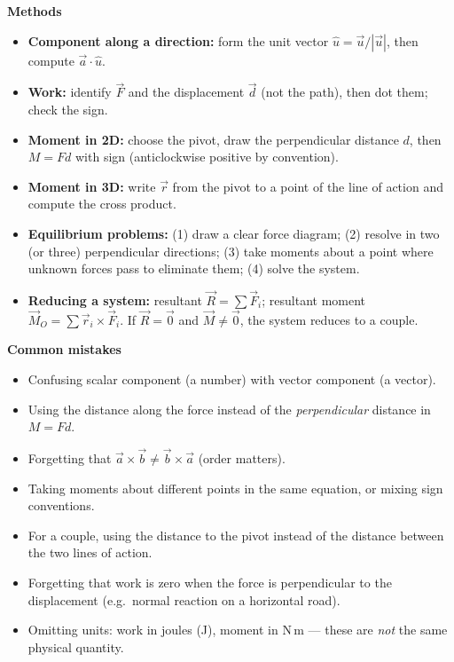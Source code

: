 \documentclass[11pt]{article}
\begin{document}
\begin{bilan}
\textbf{Methods}
\begin{itemize}
\item \textbf{Component along a direction:} form the unit vector $\hat{u}=\vec{u}/|\vec{u}|$, then compute $\vec{a}\cdot\hat{u}$.
\item \textbf{Work:} identify $\vec{F}$ and the displacement $\vec{d}$ (not the path), then dot them; check the sign.
\item \textbf{Moment in 2D:} choose the pivot, draw the perpendicular distance $d$, then $M=Fd$ with sign (anticlockwise positive by convention).
\item \textbf{Moment in 3D:} write $\vec{r}$ from the pivot to a point of the line of action and compute the cross product.
\item \textbf{Equilibrium problems:} (1) draw a clear force diagram; (2) resolve in two (or three) perpendicular directions; (3) take moments about a point where unknown forces pass to eliminate them; (4) solve the system.
\item \textbf{Reducing a system:} resultant $\vec{R}=\sum\vec{F}_i$; resultant moment $\vec{M}_O=\sum\vec{r}_i\times\vec{F}_i$. If $\vec{R}=\vec{0}$ and $\vec{M}\neq\vec{0}$, the system reduces to a couple.
\end{itemize}

\textbf{Common mistakes}
\begin{itemize}
\item Confusing scalar component (a number) with vector component (a vector).
\item Using the distance along the force instead of the \emph{perpendicular} distance in $M=Fd$.
\item Forgetting that $\vec{a}\times\vec{b}\neq\vec{b}\times\vec{a}$ (order matters).
\item Taking moments about different points in the same equation, or mixing sign conventions.
\item For a couple, using the distance to the pivot instead of the distance between the two lines of action.
\item Forgetting that work is zero when the force is perpendicular to the displacement (e.g.\ normal reaction on a horizontal road).
\item Omitting units: work in joules (J), moment in $\mathrm{N\,m}$ — these are \emph{not} the same physical quantity.
\end{itemize}


\end{bilan}
\end{document}
